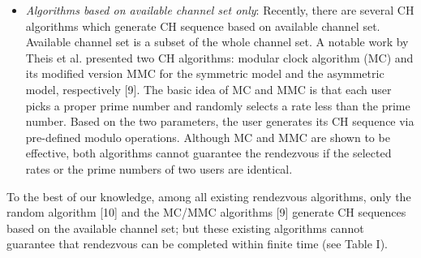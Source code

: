 \documentclass[journal]{IEEEtran}
\begin{document}
\begin{itemize}
    \item\emph{Algorithms based on available channel set only}: Recently, there are several CH algorithms which generate CH sequence based on available channel set.  Available channel set is a subset of the whole channel set. A notable work by Theis et al. presented two CH algorithms: modular clock algorithm (MC) and its modified version MMC for the symmetric model and the asymmetric model, respectively [9]. The basic idea of MC and MMC is that each user picks a proper prime number and randomly selects a rate less than the prime number. Based on the two parameters, the user generates its CH sequence via pre-defined modulo operations. Although MC and MMC are shown to be effective, both algorithms cannot guarantee the rendezvous if the selected rates or the prime numbers of two users are identical.
 \end{itemize}
 \par To the best of our knowledge, among all existing rendezvous algorithms, only the random algorithm [10] and the MC/MMC algorithms [9] generate CH sequences based on the available channel set; but these existing algorithms cannot guarantee that rendezvous can be completed within finite time (see Table I).
\end{document}
